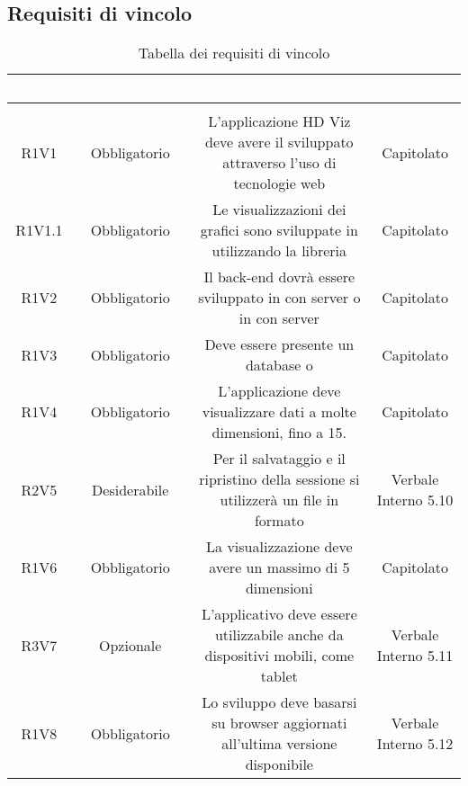 \subsection{Requisiti di vincolo}
\renewcommand{\arraystretch}{1.5}
\begin{center}
\begin{longtable}{C{\colA} C{\colB} C{\colC} C{\colA}}
		\textcolor{white}{\textbf{Codice}} & 
		\textcolor{white}{\textbf{Classificazione}} & 
		\textcolor{white}{\textbf{Descrizione}} & 
		\textcolor{white}{\textbf{Fonti}} \\
		\endfirsthead
	    \\
	    \endfoot
	    \caption{Tabella dei requisiti di vincolo}
	    \endlastfoot

R1V1 & Obbligatorio & L'applicazione HD Viz deve avere il  sviluppato attraverso l'uso di tecnologie web & Capitolato \\
R1V1.1 & Obbligatorio & Le visualizzazioni dei grafici sono sviluppate in  utilizzando la libreria  & Capitolato\\
R1V2 & Obbligatorio & Il back-end dovrà essere sviluppato in  con server  o in  con server  & Capitolato \\
R1V3 & Obbligatorio & Deve essere presente un database  o  & Capitolato\\
R1V4 & Obbligatorio & L'applicazione deve visualizzare dati a molte dimensioni, fino a 15. & Capitolato\\
R2V5 & Desiderabile & Per il salvataggio e il ripristino della sessione si utilizzerà un file in formato  & Verbale Interno 5.10\\
R1V6 & Obbligatorio & La visualizzazione  deve avere un massimo di 5 dimensioni & Capitolato\\
R3V7 & Opzionale & L'applicativo deve essere utilizzabile anche da dispositivi mobili, come tablet & Verbale Interno 5.11\\
R1V8 & Obbligatorio & Lo sviluppo deve basarsi su browser aggiornati all'ultima versione disponibile & Verbale Interno 5.12\\



\end{longtable}
\end{center}